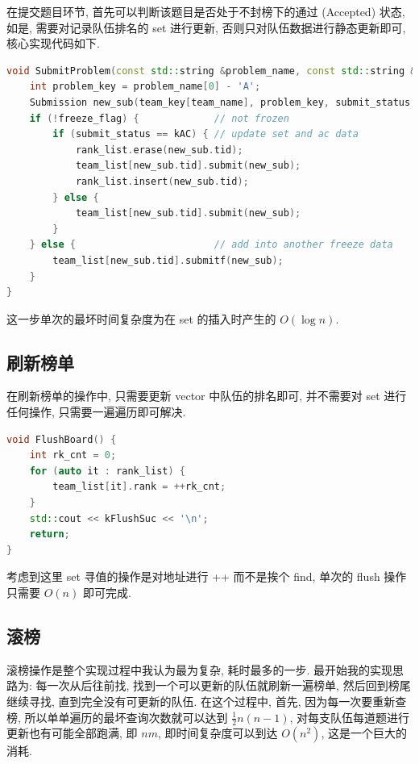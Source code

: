 \documentclass[UTF8, a4paper, 11pt]{ctexart}
\theoremstyle{definition}
\begin{document}
在提交题目环节, 首先可以判断该题目是否处于不封榜下的通过 (Accepted) 状态, 如是, 需要对记录队伍排名的 set 进行更新, 否则只对队伍数据进行静态更新即可, 核心实现代码如下.

\begin{lstlisting}[language=C++]
void SubmitProblem(const std::string &problem_name, const std::string &team_name, const int submit_status, const int tim) {
    int problem_key = problem_name[0] - 'A';
    Submission new_sub(team_key[team_name], problem_key, submit_status, tim, submit_cnt++);
    if (!freeze_flag) {             // not frozen
        if (submit_status == kAC) { // update set and ac data
            rank_list.erase(new_sub.tid);
            team_list[new_sub.tid].submit(new_sub);
            rank_list.insert(new_sub.tid);
        } else {
            team_list[new_sub.tid].submit(new_sub);
        }
    } else {                        // add into another freeze data
        team_list[new_sub.tid].submitf(new_sub);
    }
}
\end{lstlisting}
这一步单次的最坏时间复杂度为在 set 的插入时产生的 $O(\log n)$.

\subsection{刷新榜单}

在刷新榜单的操作中, 只需要更新 vector 中队伍的排名即可, 并不需要对 set 进行任何操作, 只需要一遍遍历即可解决.

\begin{lstlisting}[language=C++]
void FlushBoard() {
    int rk_cnt = 0;
    for (auto it : rank_list) {
        team_list[it].rank = ++rk_cnt;
    }
    std::cout << kFlushSuc << '\n';
    return;
}
\end{lstlisting}

考虑到这里 set 寻值的操作是对地址进行 ++ 而不是挨个 find, 单次的 flush 操作只需要 $O(n)$ 即可完成.

\subsection{滚榜}

滚榜操作是整个实现过程中我认为最为复杂, 耗时最多的一步. 最开始我的实现思路为: 每一次从后往前找, 找到一个可以更新的队伍就刷新一遍榜单, 然后回到榜尾继续寻找, 直到完全没有可更新的队伍. 在这个过程中, 首先, 因为每一次要重新查榜, 所以单单遍历的最坏查询次数就可以达到 $\frac{1}{2}n(n-1)$, 对每支队伍每道题进行更新也有可能全部跑满, 即 $nm$, 即时间复杂度可以到达 $O(n^2)$, 这是一个巨大的消耗. 
\end{document}
